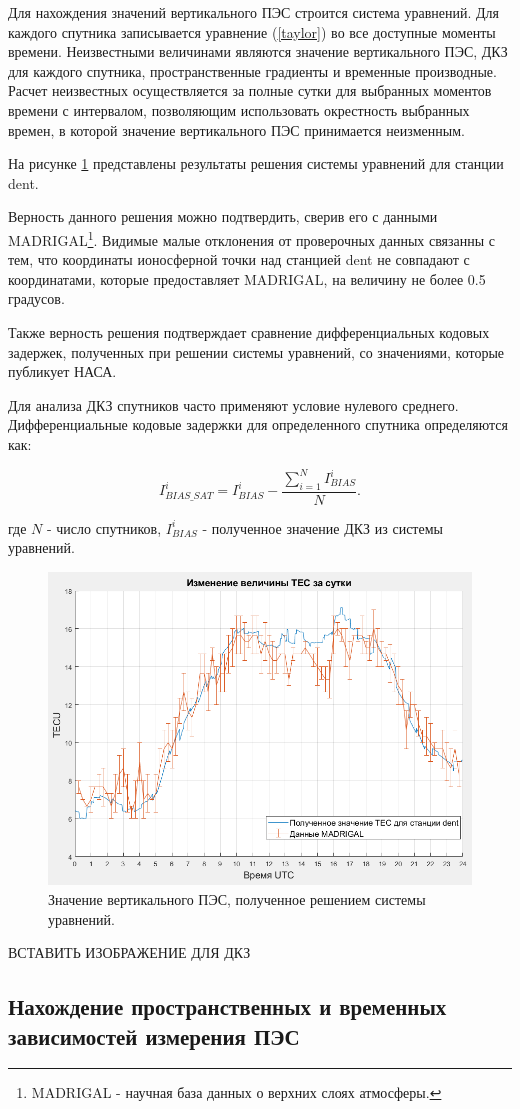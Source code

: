 \documentclass[14pt]{article}
\begin{document}
Для нахождения значений вертикального ПЭС строится система уравнений. Для каждого спутника записывается уравнение (\ref{taylor}) во все доступные моменты времени. Неизвестными величинами являются значение вертикального ПЭС, ДКЗ для каждого спутника, пространственные градиенты и временные производные. Расчет неизвестных осуществляется за полные сутки для выбранных моментов времени с интервалом, позволяющим использовать окрестность выбранных времен, в которой значение вертикального ПЭС принимается неизменным.

На рисунке \ref{solvedtec} представлены результаты решения системы уравнений для станции dent.

Верность данного решения можно подтвердить, сверив его с данными MADRIGAL\footnote{MADRIGAL - научная база данных о верхних слоях атмосферы.}. Видимые малые отклонения от проверочных данных связанны с тем, что координаты ионосферной точки над станцией dent не совпадают с координатами, которые предоставляет MADRIGAL, на величину не более 0.5 градусов.   

Также верность решения подтверждает сравнение дифференциальных кодовых задержек, полученных при решении системы уравнений, со значениями, которые публикует НАСА.

Для анализа ДКЗ спутников часто применяют условие нулевого среднего. Дифференциальные кодовые задержки для определенного спутника определяются как:

\begin{equation}
I_{BIAS\_SAT}^i = I_{BIAS}^i - \frac{\sum_{i=1}^{N}I_{BIAS}^i}{N}.
\end{equation}

где $N$ - число спутников, $I_{BIAS}^i$ - полученное значение ДКЗ из системы уравнений.

\begin{figure}[h!]
\centering
\includegraphics[width = 0.8\linewidth]{pics/solved_tec.png}
\caption{Значение вертикального ПЭС, полученное решением системы уравнений.}
\label{solvedtec}
\end{figure}

ВСТАВИТЬ ИЗОБРАЖЕНИЕ ДЛЯ ДКЗ 


\subsection{Нахождение пространственных и временных зависимостей измерения ПЭС}


\newpage
\printbibliography
\end{document}
